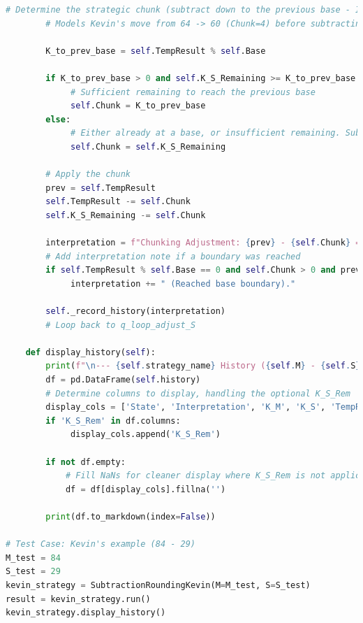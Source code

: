 \documentclass[11pt]{article}
\begin{document}
\begin{lstlisting}[language=Python]
        # Determine the strategic chunk (subtract down to the previous base - Inverse RMB)
        # Models Kevin's move from 64 -> 60 (Chunk=4) before subtracting the rest (5).

        K_to_prev_base = self.TempResult % self.Base

        if K_to_prev_base > 0 and self.K_S_Remaining >= K_to_prev_base:
             # Sufficient remaining to reach the previous base
             self.Chunk = K_to_prev_base
        else:
             # Either already at a base, or insufficient remaining. Subtract what's left.
             self.Chunk = self.K_S_Remaining

        # Apply the chunk
        prev = self.TempResult
        self.TempResult -= self.Chunk
        self.K_S_Remaining -= self.Chunk

        interpretation = f"Chunking Adjustment: {prev} - {self.Chunk} = {self.TempResult}."
        # Add interpretation note if a boundary was reached
        if self.TempResult % self.Base == 0 and self.Chunk > 0 and prev % self.Base != 0:
             interpretation += " (Reached base boundary)."

        self._record_history(interpretation)
        # Loop back to q_loop_adjust_S

    def display_history(self):
        print(f"\n--- {self.strategy_name} History ({self.M} - {self.S}) ---")
        df = pd.DataFrame(self.history)
        # Determine columns to display, handling the optional K_S_Rem
        display_cols = ['State', 'Interpretation', 'K_M', 'K_S', 'TempResult']
        if 'K_S_Rem' in df.columns:
             display_cols.append('K_S_Rem')

        if not df.empty:
            # Fill NaNs for cleaner display where K_S_Rem is not applicable
            df = df[display_cols].fillna('')

        print(df.to_markdown(index=False))

# Test Case: Kevin's example (84 - 29)
M_test = 84
S_test = 29
kevin_strategy = SubtractionRoundingKevin(M=M_test, S=S_test)
result = kevin_strategy.run()
kevin_strategy.display_history()
\end{lstlisting}
\end{document}
